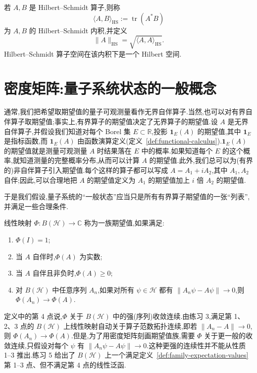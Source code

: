 若 $A,B$ 是 Hilbert--Schmidt 算子,则称
\[
 \langle A,B\rangle_{\mathrm{HS}}
 :=\operatorname{tr}(A^*B)
\]
为 $A,B$ 的 Hilbert--Schmidt 内积,并定义
\[
 \|A\|_{\mathrm{HS}}=\sqrt{\langle A,A\rangle_{\mathrm{HS}}}.
\]
Hilbert--Schmidt 算子空间在该内积下是一个 Hilbert 空间.

\section{密度矩阵:量子系统状态的一般概念}
\label{sec:density-matrices}

通常,我们把希望取期望值的量子可观测量看作无界自伴算子.当然,也可以对有界自伴算子取期望值;事实上,有界算子的期望值决定了无界算子的期望值.设 $A$ 是无界自伴算子,并假设我们知道对每个 Borel 集 $E\subset\mathbb R$,投影 $\mathbf 1_E(A)$ 的期望值,其中 $\mathbf 1_E$ 是指标函数,而 $\mathbf 1_E(A)$ 由函数演算定义(定义~\ref{def:functional-calculus}).$\mathbf 1_E(A)$ 的期望值就是测量可观测量 $A$ 时结果落在 $E$ 中的概率.如果知道每个 $E$ 的这个概率,就知道测量的完整概率分布,从而可以计算 $A$ 的期望值.此外,我们总可以为(有界的)非自伴算子引入期望值.每个这样的算子都可以写成 $A=A_1+iA_2$,其中 $A_1,A_2$ 自伴;因此,可以合理地把 $A$ 的期望值定义为 $A_1$ 的期望值加上 $i$ 倍 $A_2$ 的期望值.

于是我们假设,量子系统的“一般状态”应当只是所有有界算子期望值的一张“列表”,并满足一些合理条件.

\begin{definition}[期望值族]\label{def:family-expectation-values}
线性映射 $\Phi:B(\mathcal H)\to\mathbb C$ 称为一族期望值,如果满足:
\begin{enumerate}
\item $\Phi(I)=1$;
\item 当 $A$ 自伴时,$\Phi(A)$ 为实数;
\item 当 $A$ 自伴且非负时,$\Phi(A)\ge0$;
\item 对 $B(\mathcal H)$ 中任意序列 $A_n$,如果对所有 $\psi\in\mathcal H$ 都有 $\|A_n\psi-A\psi\|\to0$,则 $\Phi(A_n)\to\Phi(A)$.
\end{enumerate}
\end{definition}

定义中的第 4 点说,$\Phi$ 关于 $B(\mathcal H)$ 中的强(序列)收敛连续.由练习 3,满足第 1、2、3 点的 $B(\mathcal H)$ 上线性映射自动关于算子范数拓扑连续,即若 $\|A_n-A\|\to0$,则 $\Phi(A_n)\to\Phi(A)$.但是,为了用密度矩阵刻画期望值族,需要 $\Phi$ 关于更一般的收敛连续,只假设对每个 $\psi$ 有 $\|A_n\psi-A\psi\|\to0$.这种更强的连续性并不能从性质 1–3 推出.练习 5 给出了 $B(\mathcal H)$ 上一个满足定义~\ref{def:family-expectation-values} 第 1–3 点、但不满足第 4 点的线性泛函.

